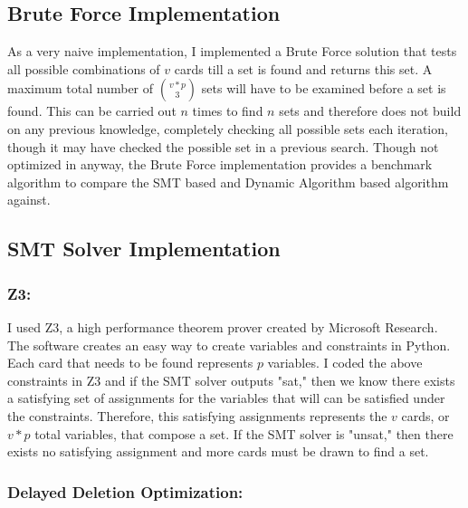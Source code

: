 \documentclass[pageno]{jpaper}
\begin{document}
\subsection{Brute Force Implementation}

As a very naive implementation, I implemented a Brute Force solution that tests all possible combinations of $v$ cards till a set is found and returns this set. A maximum total number of ${v*p}\choose{3}$ sets will have to be examined before a set is found. This can be carried out $n$ times to find $n$ sets and therefore does not build on any previous knowledge, completely checking all possible sets each iteration, though it may have checked the possible set in a previous search. Though not optimized in anyway, the Brute Force implementation provides a benchmark algorithm to compare the SMT based and Dynamic Algorithm based algorithm against. 

\subsection{SMT Solver Implementation}


\subsubsection{Z3:}
I used Z3, a high performance theorem prover created by Microsoft Research. The software creates an easy way to create variables and constraints in Python. Each card that needs to be found represents $p$ variables. I coded the above constraints in Z3 and if the SMT solver outputs "sat," then we know there exists a satisfying set of assignments for the variables that will can be satisfied under the constraints. Therefore, this satisfying assignments represents the $v$ cards, or $v*p$ total variables, that compose a set. If the SMT solver is "unsat," then there exists no satisfying assignment and more cards must be drawn to find a set. 


\subsubsection{Delayed Deletion Optimization:}
\end{document}
